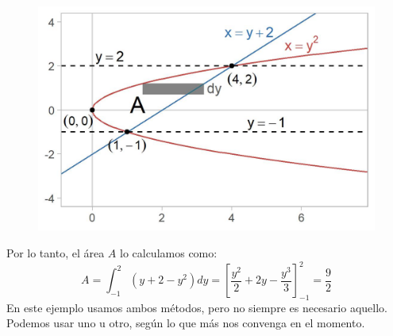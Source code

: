 \documentclass[12pt]{article}
\begin{document}
\begin{figure}[hbt!]
\centering
\includegraphics[scale=0.7]{img/example_method_2.jpg}
\end{figure}

Por lo tanto, el área $A$ lo calculamos como:
\[
A = \int_{-1}^{2}(y + 2 - y^{2})dy
  = \left[\frac{y^{2}}{2} + 2y - \frac{y^{3}}{3}\right]_{-1}^{2}
  = \frac{9}{2}
\]
En este ejemplo usamos ambos métodos, pero no siempre es necesario aquello. Podemos usar uno u otro, según lo que más nos convenga en el momento.
\end{document}
